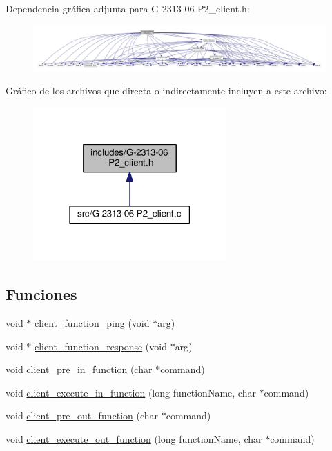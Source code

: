Dependencia gráfica adjunta para G-\/2313-\/06-\/\+P2\+\_\+client.h\+:\nopagebreak
\begin{figure}[H]
\begin{center}
\leavevmode
\includegraphics[width=350pt]{G-2313-06-P2__client_8h__incl}
\end{center}
\end{figure}
Gráfico de los archivos que directa o indirectamente incluyen a este archivo\+:\nopagebreak
\begin{figure}[H]
\begin{center}
\leavevmode
\includegraphics[width=210pt]{G-2313-06-P2__client_8h__dep__incl}
\end{center}
\end{figure}
\subsection*{Funciones}
\begin{DoxyCompactItemize}
\item 
void $\ast$ \hyperlink{G-2313-06-P2__client_8h_a7297f848d5b0bd4990857d03cf3111e4}{client\+\_\+function\+\_\+ping} (void $\ast$arg)
\item 
void $\ast$ \hyperlink{G-2313-06-P2__client_8h_afbd2dc7b3224fc3d2c5c9233b307c376}{client\+\_\+function\+\_\+response} (void $\ast$arg)
\item 
void \hyperlink{G-2313-06-P2__client_8h_aa74c686c447b275e6a8cf36419033e81}{client\+\_\+pre\+\_\+in\+\_\+function} (char $\ast$command)
\item 
void \hyperlink{G-2313-06-P2__client_8h_a6dd72e0b56b87f85d8cac2a30066198b}{client\+\_\+execute\+\_\+in\+\_\+function} (long function\+Name, char $\ast$command)
\item 
void \hyperlink{G-2313-06-P2__client_8h_a68019fe1e0edcc71bb3dadeb70a86dcd}{client\+\_\+pre\+\_\+out\+\_\+function} (char $\ast$command)
\item 
void \hyperlink{G-2313-06-P2__client_8h_a26512d35b24fec46c8fa4c803dc00867}{client\+\_\+execute\+\_\+out\+\_\+function} (long function\+Name, char $\ast$command)
\end{DoxyCompactItemize}



